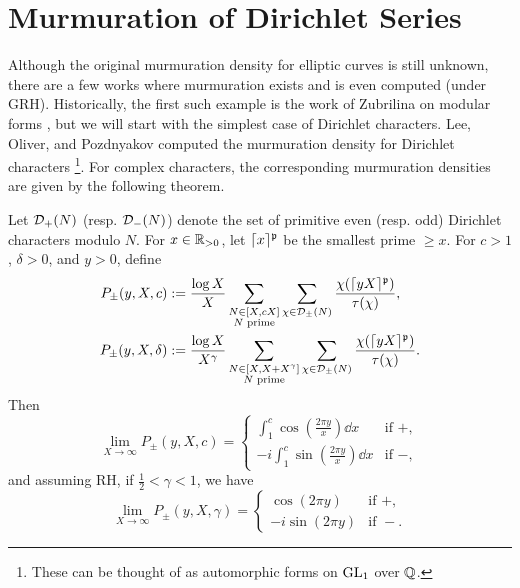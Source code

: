 \section{Murmuration of Dirichlet Series}

Although the original murmuration density for elliptic curves is still unknown, there are a few works where murmuration exists and is even computed (under GRH).
Historically, the first such example is the work of Zubrilina on modular forms \cite{zubrilina2025murmurations}, but we will start with the simplest case of Dirichlet characters.
Lee, Oliver, and Pozdnyakov computed the murmuration density for Dirichlet characters \cite{lee2025murmurations}\footnote{These can be thought of as automorphic forms on $\mathrm{GL}_1$ over $\mathbb{Q}$.}.
For complex characters, the corresponding murmuration densities are given by the following theorem.

\begin{theorem}
    \label{thm:lop_dirichlet}
    Let $\mathcal{D}_{+}(N)$ (resp. $\mathcal{D}_{-}(N)$) denote the set of primitive even (resp. odd) Dirichlet characters modulo $N$.
    For $x \in \mathbb{R}_{> 0}$, let $\lceil x \rceil^{\mathfrak{p}}$ be the smallest prime $\ge x$.
    For $c > 1$, $\delta > 0$, and $y > 0$, define
    \begin{align}
        P_{\pm}(y, X, c) &:= \frac{\log X}{X} \sum_{\substack{N \in [X, cX] \\ N \text{ prime}}} \sum_{\chi \in \mathcal{D}_{\pm}(N)} \frac{\chi(\lceil yX \rceil^{\mathfrak{p}})}{\tau(\chi)}, \label{eqn:lee_1_avg} \\
        P_{\pm}(y, X, \delta) &:= \frac{\log X}{X^\gamma} \sum_{\substack{N \in [X, X + X^\gamma] \\ N \text{ prime}}} \sum_{\chi \in \mathcal{D}_{\pm}(N)} \frac{\chi(\lceil yX \rceil^{\mathfrak{p}})}{\tau(\chi)}. \label{eqn:lee_2_avg}
    \end{align}
    Then
    \begin{equation}
        \label{eqn:lee_1}
        \lim_{X \to \infty} P_{\pm} (y, X, c) = \begin{cases}
            \int_{1}^{c} \cos\left(\frac{2 \pi y}{x}\right) \dd x & \text{if } +, \\
            -i \int_{1}^{c} \sin \left(\frac{2 \pi y}{x}\right) \dd x & \text{if } -,
        \end{cases}
    \end{equation}
    and assuming RH, if $\frac{1}{2} < \gamma < 1$, we have
    \begin{equation}
        \label{eqn:lee_2}
        \lim_{X \to \infty} P_{\pm} (y, X, \gamma) = \begin{cases}
            \cos (2 \pi y) & \text{if } +, \\
            -i \sin (2 \pi y) & \text{if } -.
        \end{cases}
    \end{equation}
\end{theorem}

